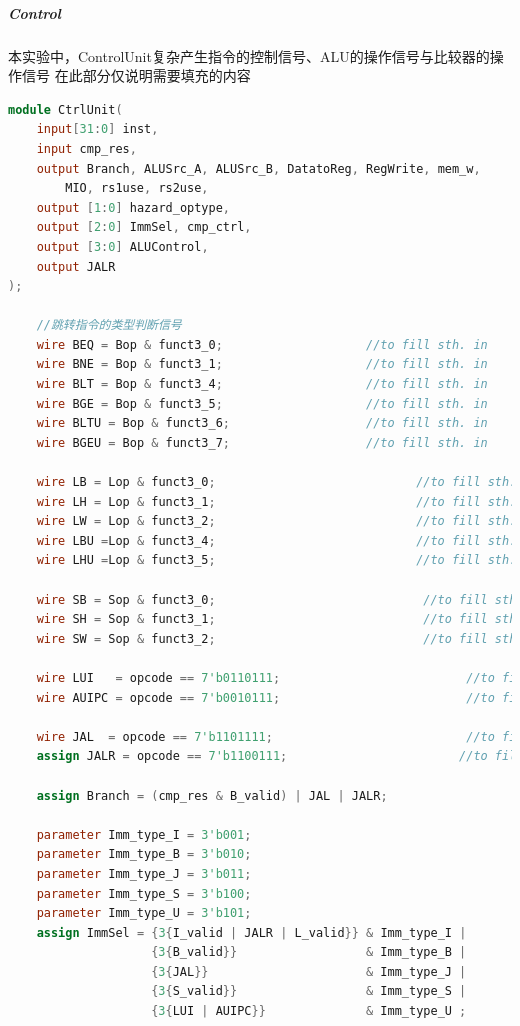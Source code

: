 \subparagraph{Control}
本实验中，ControlUnit复杂产生指令的控制信号、ALU的操作信号与比较器的操作信号
在此部分仅说明需要填充的内容
\begin{lstlisting}[language = {verilog}]
module CtrlUnit(
    input[31:0] inst,
    input cmp_res,
    output Branch, ALUSrc_A, ALUSrc_B, DatatoReg, RegWrite, mem_w,
        MIO, rs1use, rs2use,
    output [1:0] hazard_optype,
    output [2:0] ImmSel, cmp_ctrl,
    output [3:0] ALUControl,
    output JALR
);

    //跳转指令的类型判断信号
    wire BEQ = Bop & funct3_0;                    //to fill sth. in 
    wire BNE = Bop & funct3_1;                    //to fill sth. in 
    wire BLT = Bop & funct3_4;                    //to fill sth. in 
    wire BGE = Bop & funct3_5;                    //to fill sth. in 
    wire BLTU = Bop & funct3_6;                   //to fill sth. in 
    wire BGEU = Bop & funct3_7;                   //to fill sth. in 

    wire LB = Lop & funct3_0;                            //to fill sth. in 
    wire LH = Lop & funct3_1;                            //to fill sth. in 
    wire LW = Lop & funct3_2;                            //to fill sth. in 
    wire LBU =Lop & funct3_4;                            //to fill sth. in 
    wire LHU =Lop & funct3_5;                            //to fill sth. in 

    wire SB = Sop & funct3_0;                             //to fill sth. in 
    wire SH = Sop & funct3_1;                             //to fill sth. in 
    wire SW = Sop & funct3_2;                             //to fill sth. in 

    wire LUI   = opcode == 7'b0110111;                          //to fill sth. in 
    wire AUIPC = opcode == 7'b0010111;                          //to fill sth. in 

    wire JAL  = opcode == 7'b1101111;                           //to fill sth. in 
    assign JALR = opcode == 7'b1100111;                        //to fill sth. in 

    assign Branch = (cmp_res & B_valid) | JAL | JALR;                       //to fill sth. in 

    parameter Imm_type_I = 3'b001;
    parameter Imm_type_B = 3'b010;
    parameter Imm_type_J = 3'b011;
    parameter Imm_type_S = 3'b100;
    parameter Imm_type_U = 3'b101;
    assign ImmSel = {3{I_valid | JALR | L_valid}} & Imm_type_I |
                    {3{B_valid}}                  & Imm_type_B |
                    {3{JAL}}                      & Imm_type_J |
                    {3{S_valid}}                  & Imm_type_S |
                    {3{LUI | AUIPC}}              & Imm_type_U ;



\end{lstlisting}

